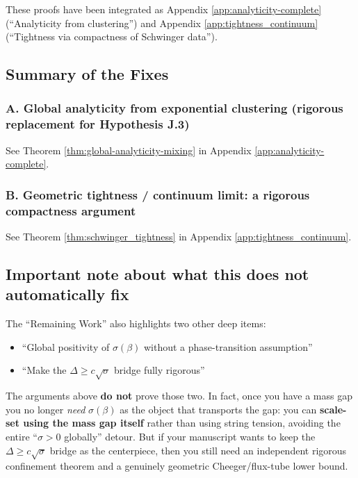 These proofs have been integrated as Appendix \ref{app:analyticity-complete} (``Analyticity from clustering'') and Appendix \ref{app:tightness_continuum} (``Tightness via compactness of Schwinger data'').

\subsection{Summary of the Fixes}

\subsubsection{A. Global analyticity from exponential clustering (rigorous replacement for Hypothesis J.3)}
See Theorem \ref{thm:global-analyticity-mixing} in Appendix \ref{app:analyticity-complete}.

\subsubsection{B. Geometric tightness / continuum limit: a rigorous compactness argument}
See Theorem \ref{thm:schwinger_tightness} in Appendix \ref{app:tightness_continuum}.

\subsection{Important note about what this does \textbf{not} automatically fix}

The ``Remaining Work'' also highlights two other deep items:

\begin{itemize}
\item ``Global positivity of $\sigma(\beta)$ without a phase-transition assumption''
\item ``Make the $\Delta \ge c\sqrt{\sigma}$ bridge fully rigorous''
\end{itemize}

The arguments above \textbf{do not} prove those two. In fact, once you have a mass gap you no longer \textit{need} $\sigma(\beta)$ as the object that transports the gap: you can \textbf{scale-set using the mass gap itself} rather than using string tension, avoiding the entire ``$\sigma > 0$ globally'' detour. But if your manuscript wants to keep the $\Delta \ge c\sqrt{\sigma}$ bridge as the centerpiece, then you still need an independent rigorous confinement theorem and a genuinely geometric Cheeger/flux-tube lower bound.
